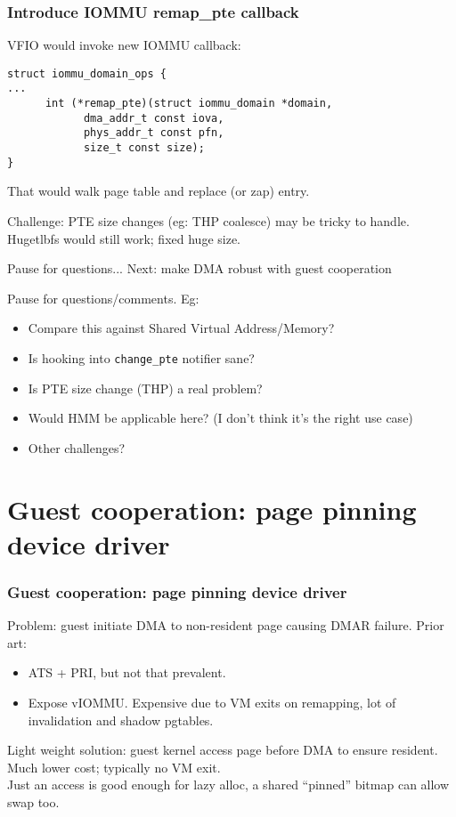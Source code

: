 \documentclass{beamer}
\begin{document}
\begin{frame}[fragile]
  \frametitle{Introduce IOMMU remap\_pte callback}
  VFIO would invoke new IOMMU callback:
  \begin{verbatim}
struct iommu_domain_ops {
...
      int (*remap_pte)(struct iommu_domain *domain,
			dma_addr_t const iova,
			phys_addr_t const pfn,
			size_t const size);
}
  \end{verbatim}
  That would walk page table and replace (or zap) entry.

  Challenge: PTE size changes (eg: THP coalesce) may be tricky to handle. Hugetlbfs would still work; fixed huge size.
\end{frame}

\begin{frame}{Pause for questions...}
  Next: make DMA robust with guest cooperation

  Pause for questions/comments. Eg:
  \begin{itemize}
    \item Compare this against Shared Virtual Address/Memory?
    \item Is hooking into \texttt{change\_pte} notifier sane?
    \item Is PTE size change (THP) a real problem?
    \item Would HMM be applicable here? (I don't think it's the right use case)
    \item Other challenges?
  \end{itemize}
\end{frame}

\section{Guest cooperation: page pinning device driver}
\begin{frame}[fragile]
  \frametitle{Guest cooperation: page pinning device driver}
  Problem: guest initiate DMA to non-resident page causing DMAR failure.
  Prior art:
  \begin{itemize}
    \item ATS + PRI, but not that prevalent.
    \item Expose vIOMMU. Expensive due to VM exits on remapping, lot of invalidation and shadow pgtables.
  \end{itemize}
   Light weight solution: guest kernel access page before DMA to ensure resident. Much lower cost; typically no VM exit.\\

  Just an access is good enough for lazy alloc, a shared ``pinned'' bitmap can allow swap too.
\end{frame}
\end{document}

